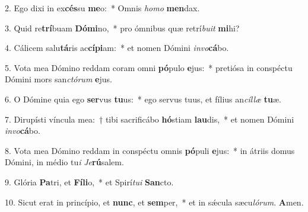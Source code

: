 \item 2. Ego dixi in ex\textbf{cés}su \textbf{me}o:~* Omnis \textit{ho}\textit{mo} \textbf{men}dax.
\item 3. Quid re\textbf{trí}buam \textbf{Dó}\textbf{mi}no,~* pro ómnibus quæ retrí\textit{bu}\textit{it} \textbf{mi}hi?
\item 4. Cálicem salu\textbf{tá}ris ac\textbf{cí}\textbf{pi}am:~* et nomen Dómini \textit{in}\textit{vo}\textbf{cá}bo.
\item 5. Vota mea Dómino reddam coram omni \textbf{pó}pulo \textbf{e}jus:~* pretiósa in conspé\-ctu Dómini mors san\textit{ctó}\textit{rum} \textbf{e}jus.
\item 6. O Dómine quia ego \textbf{ser}vus \textbf{tu}us:~* ego servus tuus, et fílius an\textit{cíl}\textit{læ} \textbf{tu}æ.
\item 7. Dirupísti víncula mea:~† tibi sacrificábo \textbf{hó}stiam \textbf{lau}dis,~* et nomen Dómini \textit{in}\textit{vo}\textbf{cá}bo.
\item 8. Vota mea Dómino reddam in conspéctu omnis \textbf{pó}puli \textbf{e}jus:~* in átriis domus Dómini, in médio tu\textit{i} \textit{Je}\textbf{rú}salem.
\item 9. Glória \textbf{Pa}tri, et \textbf{Fí}\textbf{li}o,~* et Spirí\textit{tu}\textit{i} \textbf{San}cto.
\item 10. Sicut erat in princípio, et \textbf{nunc}, et \textbf{sem}per,~* et in sǽcula sæcu\textit{ló}\textit{rum}. \textbf{A}men.